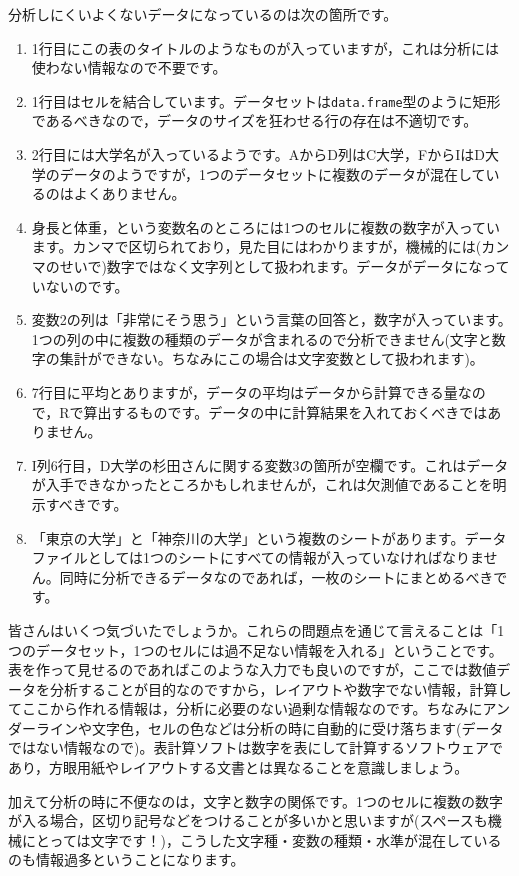 \documentclass{ltjsbook}
\begin{document}
分析しにくいよくないデータになっているのは次の箇所です。
\begin{enumerate}
	\item 1行目にこの表のタイトルのようなものが入っていますが，これは分析には使わない情報なので不要です。
	\item 1行目はセルを結合しています。データセットは\texttt{data.frame}型のように矩形であるべきなので，データのサイズを狂わせる行の存在は不適切です。
	\item 2行目には大学名が入っているようです。AからD列はC大学，FからIはD大学のデータのようですが，1つのデータセットに複数のデータが混在しているのはよくありません。
	\item 身長と体重，という変数名のところには1つのセルに複数の数字が入っています。カンマで区切られており，見た目にはわかりますが，機械的には(カンマのせいで)数字ではなく文字列として扱われます。データがデータになっていないのです。
	\item 変数2の列は「非常にそう思う」という言葉の回答と，数字が入っています。1つの列の中に複数の種類のデータが含まれるので分析できません(文字と数字の集計ができない。ちなみにこの場合は文字変数として扱われます)。
	\item 7行目に平均とありますが，データの平均はデータから計算できる量なので，Rで算出するものです。データの中に計算結果を入れておくべきではありません。
	\item I列6行目，D大学の杉田さんに関する変数3の箇所が空欄です。これはデータが入手できなかったところかもしれませんが，これは欠測値であることを明示すべきです。
	\item 「東京の大学」と「神奈川の大学」という複数のシートがあります。データファイルとしては1つのシートにすべての情報が入っていなければなりません。同時に分析できるデータなのであれば，一枚のシートにまとめるべきです。
\end{enumerate}
皆さんはいくつ気づいたでしょうか。これらの問題点を通じて言えることは「1つのデータセット，1つのセルには過不足ない情報を入れる」ということです。表を作って見せるのであればこのような入力でも良いのですが，ここでは数値データを分析することが目的なのですから，レイアウトや数字でない情報，計算してここから作れる情報は，分析に必要のない過剰な情報なのです。ちなみにアンダーラインや文字色，セルの色などは分析の時に自動的に受け落ちます(データではない情報なので)。表計算ソフトは数字を表にして計算するソフトウェアであり，方眼用紙やレイアウトする文書とは異なることを意識しましょう。

加えて分析の時に不便なのは，文字と数字の関係です。1つのセルに複数の数字が入る場合，区切り記号などをつけることが多いかと思いますが(スペースも機械にとっては文字です！)，こうした文字種・変数の種類・水準が混在しているのも情報過多ということになります。
\end{document}
